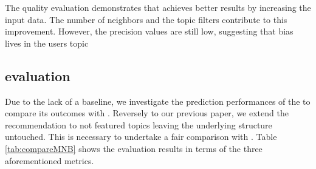 \begin{tcolorbox}[boxrule=0.86pt,left=0.3em, right=0.3em,top=0.1em, bottom=0.05em]
The quality evaluation demonstrates that \CT achieves better results by increasing the input data. The number of neighbors and the topic filters contribute to this improvement. However, the precision values are still low, suggesting that bias lives in the users topic
\end{tcolorbox}


\subsection{\MNB evaluation} \label{sec:EXP2}

\rqsecond

Due to the lack of a baseline, we investigate the prediction performances of the \MNB to compare its outcomes with \CT. Reversely to our previous paper, we extend the \MNB recommendation to not featured topics leaving the underlying structure untouched. This is necessary to undertake a fair comparison with \CT. Table \ref{tab:compareMNB} shows the evaluation results in terms  of the three aforementioned metrics. 


